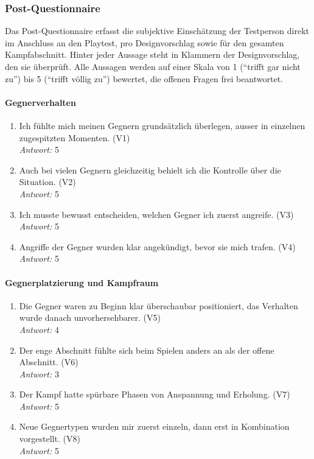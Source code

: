 \documentclass[../Main.tex]{subfiles}
\begin{document}
\subsubsection{Post-Questionnaire}

Das Post-Questionnaire erfasst die subjektive Einschätzung der Testperson direkt im Anschluss an den Playtest, pro Designvorschlag sowie für den gesamten Kampfabschnitt. Hinter jeder Aussage steht in Klammern der Designvorschlag, den sie überprüft. Alle Aussagen werden auf einer Skala von 1 (\enquote{trifft gar nicht zu}) bis 5 (\enquote{trifft völlig zu}) bewertet, die offenen Fragen frei beantwortet.

\paragraph{Gegnerverhalten}
\begin{enumerate}[label=\textbf{Q\arabic*}, leftmargin=1.5cm, itemsep=0.8em]
    \item Ich fühlte mich meinen Gegnern grundsätzlich überlegen, ausser in einzelnen zugespitzten Momenten. \hfill (V1) \\
    \textit{Antwort:} 5
    \item Auch bei vielen Gegnern gleichzeitig behielt ich die Kontrolle über die Situation. \hfill (V2) \\
    \textit{Antwort:} 5
    \item Ich musste bewusst entscheiden, welchen Gegner ich zuerst angreife. \hfill (V3) \\
    \textit{Antwort:} 5
    \item Angriffe der Gegner wurden klar angekündigt, bevor sie mich trafen. \hfill (V4) \\
    \textit{Antwort:} 5
\end{enumerate}

\paragraph{Gegnerplatzierung und Kampfraum}
\begin{enumerate}[label=\textbf{Q\arabic*}, leftmargin=1.5cm, itemsep=0.8em, resume]
    \item Die Gegner waren zu Beginn klar überschaubar positioniert, das Verhalten wurde danach unvorhersehbarer. \hfill (V5) \\
    \textit{Antwort:} 4
    \item Der enge Abschnitt fühlte sich beim Spielen anders an als der offene Abschnitt. \hfill (V6) \\
    \textit{Antwort:} 3
    \item Der Kampf hatte spürbare Phasen von Anspannung und Erholung. \hfill (V7) \\
    \textit{Antwort:} 5
    \item Neue Gegnertypen wurden mir zuerst einzeln, dann erst in Kombination vorgestellt. \hfill (V8) \\
    \textit{Antwort:} 5
\end{enumerate}
\end{document}

